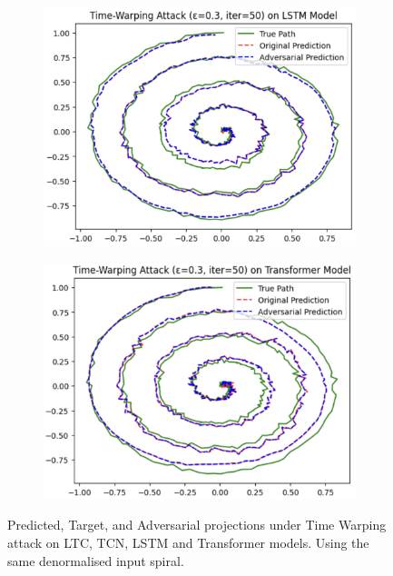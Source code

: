 \begin{figure}[H]
\begin{subfigure}[b]{0.45\linewidth}
        \includegraphics[width=\linewidth]{img/time_warping_spiral_lstm.png}
        \label{fig:time_warping_spiral_lstm}
    \end{subfigure}
    \hfill
    \begin{subfigure}[b]{0.45\linewidth}
        \includegraphics[width=\linewidth]{img/time_warping_spiral_transformer.png}
        \label{fig:time_warping_spiral_transformer}
    \end{subfigure}
    \caption{Predicted, Target, and Adversarial projections under Time Warping attack on LTC, TCN, LSTM and Transformer models. Using the same denormalised input spiral.}
    \label{fig:time_warping_spirals}
\end{figure}

